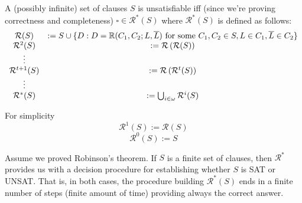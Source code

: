 A (possibly infinite) set of clauses $S$ is unsatisfiable iff (since we're proving correctness and completeness) $\square \in \mathcal{R}^\ast (S)$ where $\mathcal{R}^\ast (S)$ is defined as follows:
$$ \begin{array}{c c}
	\mathcal{R}(S) & := S \cup \{D : D = \mathbb{R} (C_1, C_2; L, \overline L) \text{ for some } C_1, C_2 \in S, L \in C_1, \overline L \in C_2 \} \\
	\mathcal{R}^2 (S) & := \mathcal{R} \left(\mathcal{R} (S)\right) \\
	\vdots & \\
	\mathcal{R}^{t+1} (S) & := \mathcal{R} \left(\mathcal{R}^t (S)\right) \\
	\vdots & \\
	\mathcal{R}^\ast (S) & := \bigcup_{i \in \omega} \mathcal{R}^i (S)
\end{array}
$$

For simplicity
$$ \mathcal{R}^1 (S) := \mathcal{R} (S) $$
$$ \mathcal{R}^0 (S) := S $$

\begin{remark}
	Assume we proved Robinson's theorem. If $S$ is a finite set of clauses, then $\mathcal{R}^\ast$ provides us with a decision procedure for establishing whether $S$ is SAT or UNSAT. That is, in both cases, the procedure building $\mathcal{R}^\ast (S)$ ends in a finite number of steps (finite amount of time) providing always the correct answer.\\
\end{remark}


